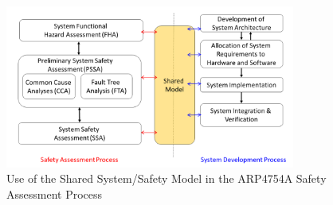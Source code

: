 \begin{figure}[t!]
	\centering
	\includegraphics[trim=0 5 0 5,clip,width=0.85\textwidth]{images/process3.png}
	\caption{Use of the Shared System/Safety Model in the ARP4754A Safety Assessment Process}
	\label{fig:proposed_safety_process}
\end{figure}




